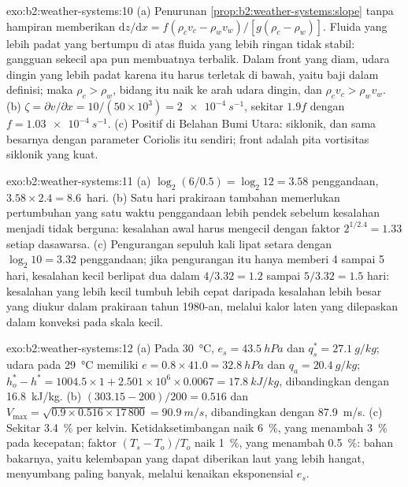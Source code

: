 \begin{solution}{exo:b2:weather-systems:10}
(a) Penurunan \cref{prop:b2:weather-systems:slope} tanpa hampiran memberikan
$\mathrm{d}z/\mathrm{d}x = f(\rho_c v_c - \rho_w v_w)/[g(\rho_c - \rho_w)]$. Fluida yang lebih padat
yang bertumpu di atas fluida yang lebih ringan tidak stabil: gangguan sekecil apa pun membuatnya terbalik. Dalam front yang
diam, udara dingin yang lebih padat karena itu harus terletak di bawah, yaitu baji dalam definisi; maka
$\rho_c > \rho_w$, bidang itu naik ke arah udara dingin, dan $\rho_c v_c > \rho_w v_w$.
(b) $\zeta = \partial v/\partial x = 10/(50 \times 10^3) = \qty{2e-4}{s^{-1}}$, sekitar $1.9f$ dengan
$f = \qty{1.03e-4}{s^{-1}}$. (c) Positif di Belahan Bumi Utara: siklonik, dan sama besarnya dengan
parameter Coriolis itu sendiri; front adalah pita vortisitas siklonik yang kuat.
\end{solution}

\begin{solution}{exo:b2:weather-systems:11}
(a) $\log_2(6/0.5) = \log_2 12 = 3.58$ penggandaan, $3.58 \times 2.4 = 8.6$~hari. (b) Satu hari
prakiraan tambahan memerlukan pertumbuhan yang satu waktu penggandaan lebih pendek sebelum kesalahan menjadi tidak berguna: kesalahan
awal harus mengecil dengan faktor $2^{1/2.4} = 1.33$ setiap dasawarsa. (c) Pengurangan sepuluh kali lipat setara dengan
$\log_2 10 = 3.32$ penggandaan; jika pengurangan itu hanya memberi 4 sampai 5 hari, kesalahan kecil berlipat dua dalam $4/3.32 = 1.2$
sampai $5/3.32 = 1.5$ hari: kesalahan yang lebih kecil tumbuh lebih cepat daripada kesalahan lebih besar yang diukur dalam
prakiraan tahun 1980-an, melalui kalor laten yang dilepaskan dalam konveksi pada skala kecil.
\end{solution}

\begin{solution}{exo:b2:weather-systems:12}
(a) Pada \qty{30}{\celsius}, $e_s = \qty{43.5}{hPa}$ dan $q_s^* = \qty{27.1}{g/kg}$; udara pada
\qty{29}{\celsius} memiliki $e = 0.8 \times 41.0 = \qty{32.8}{hPa}$ dan $q_a = \qty{20.4}{g/kg}$;
$h_o^* - h^* = 1004.5 \times 1 + 2.501 \times 10^6 \times 0.0067 = \qty{17.8}{kJ/kg}$, dibandingkan dengan
\qty{16.8}{kJ/kg}. (b) $(303.15 - 200)/200 = 0.516$ dan $V_{\max} = \sqrt{0.9 \times 0.516
\times 17\,800} = \qty{90.9}{m/s}$, dibandingkan dengan \qty{87.9}{m/s}. (c) Sekitar \qty{3.4}{\percent} per
kelvin. Ketidaksetimbangan naik \qty{6}{\percent}, yang menambah \qty{3}{\percent} pada kecepatan;
faktor $(T_s - T_o)/T_o$ naik \qty{1}{\percent}, yang menambah \qty{0.5}{\percent}: bahan
bakarnya, yaitu kelembapan yang dapat diberikan laut yang lebih hangat, menyumbang paling banyak, melalui kenaikan eksponensial
$e_s$.
\end{solution}

